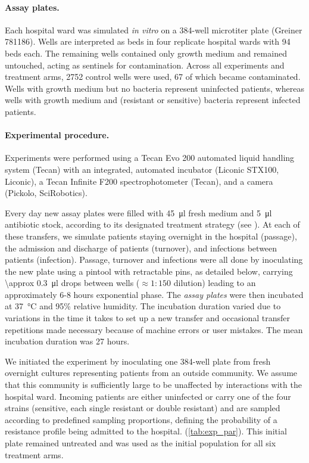 \paragraph{Assay plates.}
Each hospital ward was simulated \textit{in vitro} on a 384-well microtiter plate (Greiner 781186).
Wells are interpreted as beds in four replicate hospital wards with 94 beds each. 
The remaining wells contained only growth medium and remained untouched, acting as sentinels for contamination.
Across all experiments and treatment arms, 2752 control wells were used, 67 of which became contaminated.
Wells with growth medium but no bacteria represent uninfected patients, whereas wells with growth medium and (resistant or sensitive) bacteria represent infected patients. 

\paragraph{Experimental procedure. \label{par:setup}}
Experiments were performed using a Tecan Evo 200 automated liquid handling system (Tecan) with an integrated, automated incubator (Liconic STX100, Liconic), a Tecan Infinite F200 spectrophotometer (Tecan), and a camera (Pickolo, SciRobotics).

Every day new assay plates were filled with \SI{45}{\micro \l} fresh medium and \SI{5}{\micro \l} antibiotic stock, according to its designated treatment strategy (see ).
At each of these transfers, we simulate patients staying overnight in the hospital (passage), the admission and discharge of patients (turnover), and infections between patients (infection).
Passage, turnover and infections were all done by inoculating the new plate using a pintool with retractable pins, as detailed below, carrying \SI{\approx 0.3}{\micro \litre} drops between wells ($\approx1:150$ dilution) leading to an approximately 6-8 hours exponential phase. 
The \textit{assay plates} were then incubated at \SI{37}{\celsius} and 95\% relative humidity.
The incubation duration varied due to variations in the time it takes to set up a new transfer and occasional transfer repetitions made necessary because of machine errors or user mistakes.
The mean incubation duration was 27 hours.

We initiated the experiment by inoculating one 384-well plate from fresh overnight cultures representing patients from an outside community. 
We assume that this community is sufficiently large to be unaffected by interactions with the hospital ward. 
Incoming patients are either uninfected or carry one of the four strains (sensitive, each single resistant or double resistant) and are sampled according to predefined sampling proportions, defining the probability of a resistance profile being admitted to the hospital. (\autoref{tab:exp_par}).
This initial plate remained untreated and was used as the initial population for all six treatment arms.


